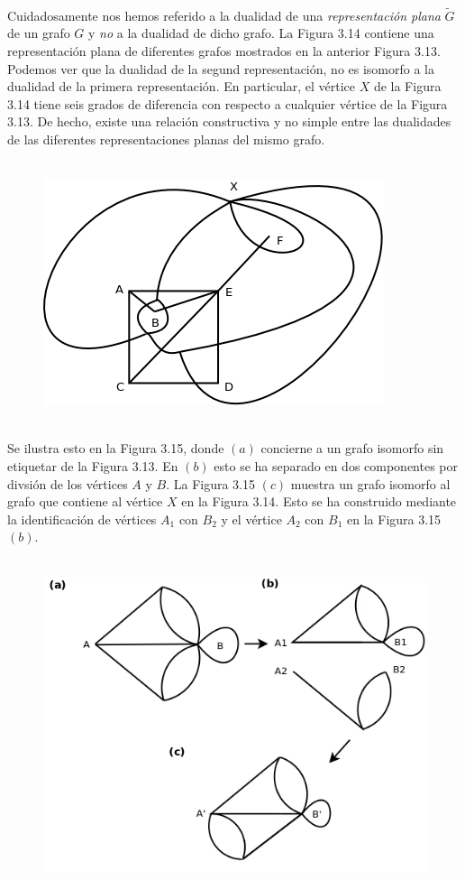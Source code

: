 \documentclass[10pt,a5paper]{book}
\begin{document}
\hrulefill{}\\
Cuidadosamente nos hemos referido a la dualidad de una \emph{representación plana} $\widetilde{G}$ de un grafo $G$ y \emph{no} a la dualidad de dicho grafo. La Figura 3.14 contiene una representación plana de diferentes grafos mostrados en la anterior Figura 3.13. Podemos ver que la dualidad de la segund representación, no es isomorfo a la dualidad de la primera representación. En particular, el vértice $X$ de la Figura 3.14 tiene seis grados de diferencia con respecto a cualquier vértice de la Figura 3.13. De hecho, existe una relación constructiva y no simple entre las dualidades de las diferentes representaciones planas del mismo grafo.

\begin{figure}[H]
\caption{ }
\hrulefill{}\\
\includegraphics[scale=.4]{Fig3_14.png}
\end{figure}
\hrulefill{}\\
Se ilustra esto en la Figura 3.15, donde $(a)$ concierne a un grafo isomorfo sin etiquetar de la Figura 3.13. En $(b)$ esto se ha separado en dos componentes por divsión de los vértices $A$ y $B$. La Figura 3.15 $(c)$ muestra un grafo isomorfo al grafo que contiene al vértice $X$ en la Figura 3.14. Esto se ha construido mediante la identificación de vértices $A_1$ con $B_2$ y el vértice $A_2$ con $B_1$ en la Figura 3.15 $(b)$.
\begin{figure}[H]
\caption{ }
\hrulefill{}\\
\hspace*{-.4in}\includegraphics[scale=.4]{Fig3_15}
\end{figure}
\end{document}
